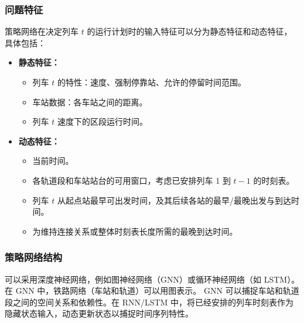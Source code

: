 \documentclass{article}
\begin{document}
    \subsubsection{问题特征}
    策略网络在决定列车 $t$ 的运行计划时的输入特征可以分为静态特征和动态特征，具体包括：
    \begin{itemize}
        \item \textbf{静态特征：}
        \begin{itemize}
            \item 列车 $t$ 的特性：速度、强制停靠站、允许的停留时间范围。
            \item 车站数据：各车站之间的距离。
            \item 列车 $t$ 速度下的区段运行时间。
        \end{itemize}
        \item \textbf{动态特征：}
        \begin{itemize}
            \item 当前时间。
            \item 各轨道段和车站站台的可用窗口，考虑已安排列车 1 到 $t-1$ 的时刻表。
            \item 列车 $t$ 从起点站最早可出发时间，及其后续各站的最早/最晚出发与到达时间。
            \item 为维持连接关系或整体时刻表长度所需的最晚到达时间。
        \end{itemize}
    \end{itemize}

    \subsubsection{策略网络结构}
    可以采用深度神经网络，例如图神经网络（GNN）或循环神经网络（如 LSTM）。在 GNN 中，铁路网络（车站和轨道）可以用图表示。
    GNN 可以捕捉车站和轨道段之间的空间关系和依赖性。在 RNN/LSTM 中，将已经安排的列车时刻表作为隐藏状态输入，动态更新状态以捕捉时间序列特性。
\end{document}
